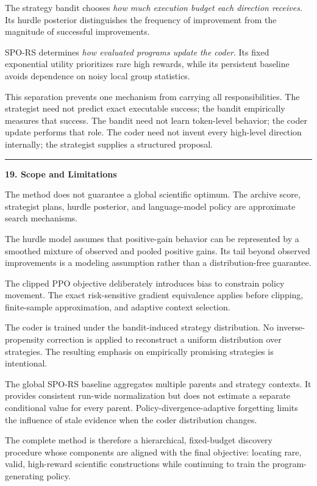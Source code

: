 \documentclass[
]{article}
\begin{document}
The strategy bandit chooses \emph{how much execution budget each
direction receives}. Its hurdle posterior distinguishes the frequency of
improvement from the magnitude of successful improvements.

SPO-RS determines \emph{how evaluated programs update the coder}. Its
fixed exponential utility prioritizes rare high rewards, while its
persistent baseline avoids dependence on noisy local group statistics.

This separation prevents one mechanism from carrying all
responsibilities. The strategist need not predict exact executable
success; the bandit empirically measures that success. The bandit need
not learn token-level behavior; the coder update performs that role. The
coder need not invent every high-level direction internally; the
strategist supplies a structured proposal.

\begin{center}\rule{0.5\linewidth}{0.5pt}\end{center}

\textbf{19. Scope and Limitations}

The method does not guarantee a global scientific optimum. The archive
score, strategist plans, hurdle posterior, and language-model policy are
approximate search mechanisms.

The hurdle model assumes that positive-gain behavior can be represented
by a smoothed mixture of observed and pooled positive gains. Its tail
beyond observed improvements is a modeling assumption rather than a
distribution-free guarantee.

The clipped PPO objective deliberately introduces bias to constrain
policy movement. The exact risk-sensitive gradient equivalence applies
before clipping, finite-sample approximation, and adaptive context
selection.

The coder is trained under the bandit-induced strategy distribution. No
inverse-propensity correction is applied to reconstruct a uniform
distribution over strategies. The resulting emphasis on empirically
promising strategies is intentional.

The global SPO-RS baseline aggregates multiple parents and strategy
contexts. It provides consistent run-wide normalization but does not
estimate a separate conditional value for every parent.
Policy-divergence-adaptive forgetting limits the influence of stale
evidence when the coder distribution changes.

The complete method is therefore a hierarchical, fixed-budget discovery
procedure whose components are aligned with the final objective:
locating rare, valid, high-reward scientific constructions while
continuing to train the program-generating policy.
\end{document}
